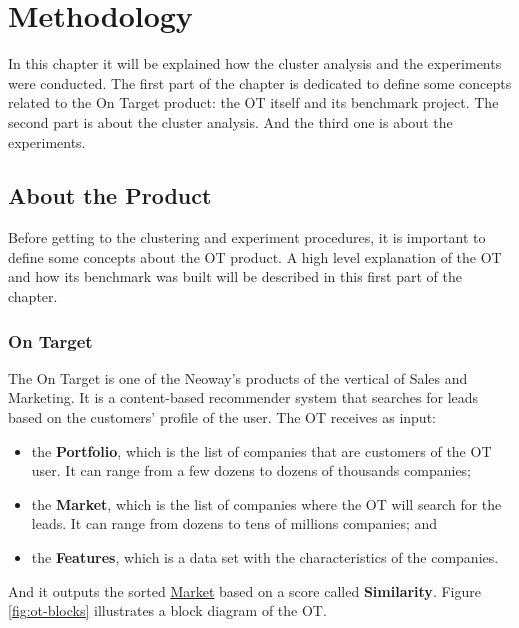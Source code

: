 \chapter{Methodology}
\label{ch:methodology}

In this chapter it will be explained how the cluster analysis and the experiments were conducted. The first part of the chapter is dedicated to define some concepts related to the On Target product: the OT itself and its benchmark project. The second part is about the cluster analysis. And the third one is about the experiments.

\section{About the Product}

Before getting to the clustering and experiment procedures, it is important to define some concepts about the OT product. A high level explanation of the OT and how its benchmark was built will be described in this first part of the chapter.

\subsection{On Target}

The On Target is one of the Neoway's products of the vertical of Sales and Marketing. It is a content-based recommender system that searches for leads based on the customers' profile of the user. The OT receives as input:
\begin{itemize}
    \item the \textbf{Portfolio}, which is the list of companies that are customers of the OT user. It can range from a few dozens to dozens of thousands companies;
    \item the \textbf{Market}, which is the list of companies where the OT will search for the leads. It can range from dozens to tens of millions companies; and
    \item the \textbf{Features}, which is a data set with the characteristics of the companies.
\end{itemize}
And it outputs the sorted \underline{Market} based on a score called \textbf{Similarity}. Figure \ref{fig:ot-blocks} illustrates a block diagram of the OT.

